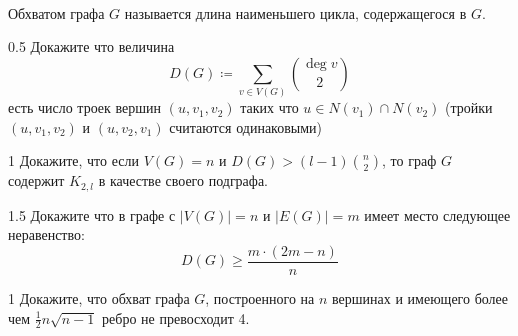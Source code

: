 \documentclass[a4paper,12pt,twoside]{article}
\begin{document}
\begin{?}\ \\
    Обхватом графа $G$ называется длина наименьшего цикла, содержащегося в $G$.
    \begin{tasklist}
        \item[0.5] Докажите что величина
        \[
            D(G) \coloneqq \sum_{v \in V(G)} \binom{\deg v}{2}
        \]
        есть число троек вершин \((u, v_1, v_2)\) таких что \(u \in N(v_1) \cap N(v_2)\) (тройки \((u, v_1, v_2)\) и \((u, v_2, v_1)\) считаются одинаковыми)
        \item[1] Докажите, что если \(V(G) = n\) и
        \(
            D(G) > (l - 1) \binom{n}{2}
        \),
        то граф \(G\) содержит \(K_{2, l}\) в качестве своего подграфа.
        \item[1.5] Докажите что в графе с \(|V(G)| = n\) и \(|E(G)| = m\) имеет место следующее неравенство:
        \[
            D(G) \geq \frac{m \cdot (2m - n)}{n}
        \]
        \item[1] Докажите, что обхват графа \(G\), построенного на \(n\) вершинах и имеющего более чем \(\tfrac{1}{2}n \sqrt{n - 1}\) ребро не превосходит 4.
    \end{tasklist}
\end{?}
\end{document}

